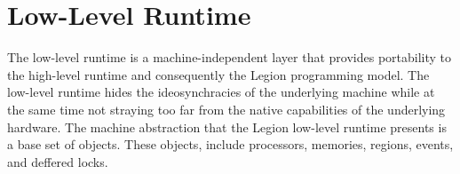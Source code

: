 \section{Low-Level Runtime}
\label{sec:lowlevel}

The low-level runtime is a machine-independent layer that provides portability
to the high-level runtime and consequently the Legion programming model.
The low-level runtime hides the ideosynchracies of the underlying machine while
at the same time not straying 
too far from the native capabilities of the underlying hardware.  
The machine abstraction that the Legion low-level runtime presents is a base set
of objects.  These objects,
include processors, memories, regions, events, and deffered locks.






